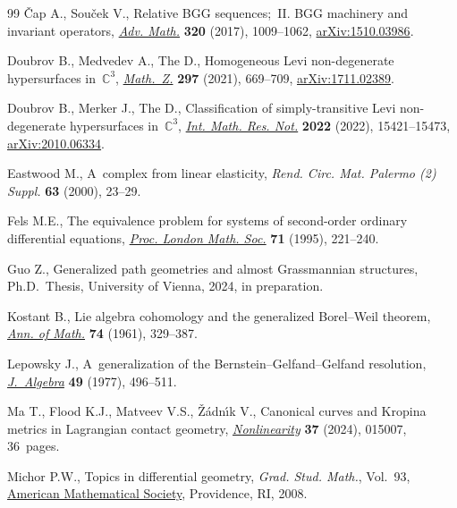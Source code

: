 \documentclass[10pt,a4paper]{amsart}
\numberwithin{equation}{section}
\begin{document}
\begin{thebibliography}{99}
{\v{C}}ap A., Sou\v{c}ek V., Relative {BGG} sequences;~{II}. {BGG} machinery
 and invariant operators, \href{https://doi.org/10.1016/j.aim.2017.09.016}{\textit{Adv. Math.}} \textbf{320} (2017), 1009--1062,
 \href{https://arxiv.org/abs/1510.03986}{arXiv:1510.03986}.

Doubrov B., Medvedev A., The D., Homogeneous {L}evi non-degenerate
 hypersurfaces in~{$\mathbb{C}^3$}, \href{https://doi.org/10.1007/s00209-020-02528-2}{\textit{Math.~Z.}} \textbf{297} (2021),
 669--709, \href{https://arxiv.org/abs/1711.02389}{arXiv:1711.02389}.

Doubrov B., Merker J., The D., Classification of simply-transitive {L}evi
 non-degenerate hypersurfaces in~{$\mathbb{C}^3$}, \href{https://doi.org/10.1093/imrn/rnab147}{\textit{Int. Math. Res.
 Not.}} \textbf{2022} (2022), 15421--15473, \href{https://arxiv.org/abs/2010.06334}{arXiv:2010.06334}.

Eastwood M., A~complex from linear elasticity, \textit{Rend. Circ. Mat. Palermo (2) Suppl.} \textbf{63} (2000), 23--29.

Fels M.E., The equivalence problem for systems of second-order ordinary
 differential equations, \href{https://doi.org/10.1112/plms/s3-71.1.221}{\textit{Proc. London Math. Soc.}} \textbf{71} (1995),
 221--240.

Guo Z., Generalized path geometries and almost {G}rassmannian structures, Ph.D.~Thesis, {U}niversity of Vienna, 2024, in preparation.

Kostant B., Lie algebra cohomology and the generalized {B}orel--{W}eil theorem,
 \href{https://doi.org/10.2307/1970237}{\textit{Ann. of Math.}} \textbf{74} (1961), 329--387.

Lepowsky J., A~generalization of the {B}ernstein--{G}elfand--{G}elfand
 resolution, \href{https://doi.org/10.1016/0021-8693(77)90254-X}{\textit{J.~Algebra}} \textbf{49} (1977), 496--511.

Ma T., Flood K.J., Matveev V.S., \v{Z}\'adn\'{\i}k V., Canonical curves and
 {K}ropina metrics in {L}agrangian contact geometry, \href{https://doi.org/10.1088/1361-6544/ad0c2b}{\textit{Nonlinearity}}
 \textbf{37} (2024), 015007, 36~pages.

Michor P.W., Topics in differential geometry, \textit{Grad. Stud. Math.},
 Vol.~93, \href{https://doi.org/10.1090/gsm/093}{American Mathematical Society}, Providence, RI, 2008.


\end{thebibliography}
\end{document}
